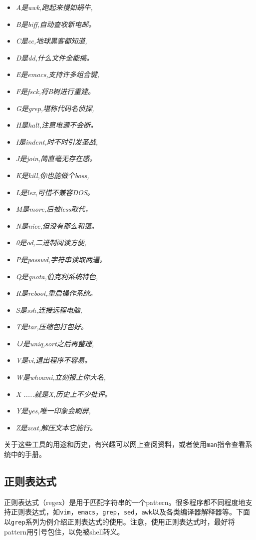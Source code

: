 \begin{itemize}
  \item \textit{A是awk,跑起来慢如蜗牛,}
  \item \textit{B是biff,自动查收新电邮。}
  \item \textit{C是cc,地球黑客都知道,}
  \item \textit{D是dd,什么文件全能搞。}
  \item \textit{E是emacs,支持许多组合键,}
  \item \textit{F是fsck,将B树进行重建。}
  \item \textit{G是grep,堪称代码名侦探,}
  \item \textit{H是halt,注意电源不会断。}
  \item \textit{I是indent,时不时引发圣战,}
  \item \textit{J是join,简直毫无存在感。}
  \item \textit{K是kill,你也能做个boss,}
  \item \textit{L是lex,可惜不兼容DOS。}
  \item \textit{M是more,后被less取代，}
  \item \textit{N是nice,但没有那么和蔼。}
  \item \textit{0是od,二进制阅读方便,}
  \item \textit{P是passwd,字符串读取两遍。}
  \item \textit{Q是quota,伯克利系统特色,}
  \item \textit{R是reboot,重启操作系统。}
  \item \textit{S是ssh,连接远程电脑,}
  \item \textit{T是tar,压缩包打包好。}
  \item \textit{∪是uniq,sort之后再整理,}
  \item \textit{V是vi,退出程序不容易。}
  \item \textit{W是whoami,立刻报上你大名,}
  \item \textit{X .....就是X,历史上不少批评。}
  \item \textit{Y是yes,唯一印象会刷屏,}
  \item \textit{Z是zcat,解压文本它能行。}
\end{itemize}
关于这些工具的用途和历史，有兴趣可以网上查阅资料，或者使用\texttt{man}指令查看系统中的手册。

\subsection{正则表达式}
正则表达式（regex）是用于匹配字符串的一个pattern。很多程序都不同程度地支持正则表达式，如\texttt{vim}，\texttt{emacs}，\texttt{grep}，\texttt{sed}，\texttt{awk}以及各类编译器解释器等。下面以\texttt{grep}系列为例介绍正则表达式的使用。注意，使用正则表达式时，最好将pattern用引号包住，以免被shell转义。

